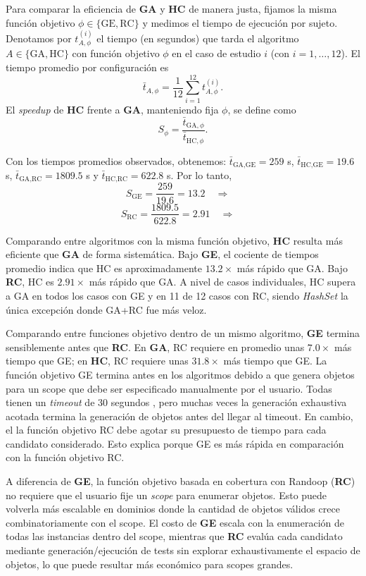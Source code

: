 Para comparar la eficiencia de \textbf{GA} y \textbf{HC} de manera justa, fijamos la
misma función objetivo \(\phi \in \{\text{GE},\text{RC}\}\) y medimos el tiempo de
ejecución por sujeto. Denotamos por \(t_{A,\phi}^{(i)}\) el tiempo (en segundos)
que tarda el algoritmo \(A \in \{\text{GA},\text{HC}\}\) con función objetivo
\(\phi\) en el caso de estudio \(i\) (con \(i=1,\dots,12\)). El tiempo promedio por
configuración es
\[
\bar t_{A,\phi}=\frac{1}{12}\sum_{i=1}^{12} t_{A,\phi}^{(i)}.
\]
El \emph{speedup} de \textbf{HC} frente a \textbf{GA}, manteniendo fija \(\phi\), se
define como
\[
S_{\phi}=\frac{\bar t_{\text{GA},\phi}}{\bar t_{\text{HC},\phi}}.
\]

Con los tiempos promedios observados, obtenemos:
\(\bar t_{\text{GA},\text{GE}}=259\) s,
\(\bar t_{\text{HC},\text{GE}}=19{.}6\) s,
\(\bar t_{\text{GA},\text{RC}}=1809{.}5\) s y
\(\bar t_{\text{HC},\text{RC}}=622{.}8\) s. Por lo tanto,
\[
S_{\text{GE}}=\frac{259}{19{.}6}=13{.}2\quad\Rightarrow\quad
\]
\[
S_{\text{RC}}=\frac{1809{.}5}{622{.}8}=2{.}91\quad\Rightarrow\quad
\]

Comparando entre algoritmos con la misma función objetivo, \textbf{HC} resulta más
eficiente que \textbf{GA} de forma sistemática. Bajo \textbf{GE}, el cociente de
tiempos promedio indica que HC es aproximadamente \(13.2\times\) más rápido que GA. Bajo \textbf{RC},
HC es \(2.91\times\) más rápido que GA. A nivel de casos
individuales, HC supera a GA en todos los casos con GE y en 11 de 12 casos con RC,
siendo \emph{HashSet} la única excepción donde GA+RC fue más veloz. 

Comparando entre funciones objetivo dentro de un mismo algoritmo, \textbf{GE}
termina sensiblemente antes que \textbf{RC}. En \textbf{GA}, RC requiere en promedio
unas \(7.0\times\) más tiempo que GE; en \textbf{HC}, RC requiere unas \(31.8\times\)
más tiempo que GE. La función objetivo GE termina antes en los algoritmos debido a que genera objetos 
para un scope que debe ser especificado manualmente por el usuario. Todas tienen un \emph{timeout} de 
30 segundos , pero muchas veces
la generación exhaustiva acotada termina la generación de objetos antes del llegar al timeout. En cambio, el la función objetivo RC debe agotar su presupuesto de tiempo
para cada candidato considerado.
Esto explica porque GE es más rápida en comparación con la función objetivo RC.

A diferencia de \textbf{GE}, la función objetivo basada en cobertura con Randoop
(\textbf{RC}) no requiere que el usuario fije un \emph{scope} para enumerar
objetos. Esto puede volverla más escalable en dominios donde la cantidad de
objetos válidos crece combinatoriamente con el scope. 
El costo de \textbf{GE} escala con la enumeración de todas
las instancias dentro del scope, mientras que \textbf{RC} evalúa cada candidato
mediante generación/ejecución de tests sin explorar exhaustivamente el
espacio de objetos, lo que puede resultar más económico para scopes grandes.

